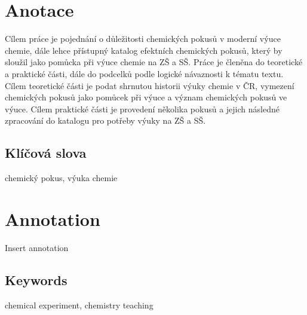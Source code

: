 \documentclass{template/socthesis}
\author{Jan Romanovský}
\begin{document}
	\maketitle


	\pagestyle{empty}

	\section*{Anotace}
	Cílem práce je pojednání o důležitosti chemických pokusů v moderní výuce chemie, dále lehce přístupný katalog efektních chemických pokusů, který by sloužil jako pomůcka při výuce chemie na ZŠ a SŠ. Práce je členěna do teoretické a praktické části, dále do podcelků podle logické návaznosti k tématu textu.
	Cílem teoretické části je podat shrnutou historii výuky chemie v ČR, vymezení chemických pokusů jako pomůcek při výuce a význam chemických pokusů ve výuce.
	Cílem praktické části je provedení několika pokusů a jejich následné zpracování do katalogu pro potřeby výuky na ZŠ a SŠ.

	\subsection*{Klíčová slova}
	chemický pokus, výuka chemie

	\vspace{20mm}

	\section*{Annotation}
	Insert annotation

	\subsection*{Keywords}
	chemical experiment, chemistry teaching

	\newpage
	\pagestyle{plain}

    \tableofcontents %

	\setcounter{figure}{0}
	\setcounter{table}{0}
	\newpage

	

	

	

	

	\newpage
	\printbibliography[title=Literatura]



\end{document}
